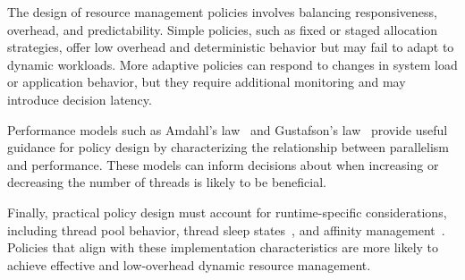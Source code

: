 The design of resource management policies involves balancing responsiveness, overhead, and predictability. Simple policies, such as fixed or staged allocation strategies, offer low overhead and deterministic behavior but may fail to adapt to dynamic workloads. More adaptive policies can respond to changes in system load or application behavior, but they require additional monitoring and may introduce decision latency.

Performance models such as Amdahl's law~\parencite{Amdahl1967} and Gustafson's law~\parencite{Gustafson1988} provide useful guidance for policy design by characterizing the relationship between parallelism and performance. These models can inform decisions about when increasing or decreasing the number of threads is likely to be beneficial.

Finally, practical policy design must account for runtime-specific considerations, including thread pool behavior, thread sleep states~\parencite{noauthor_welcome_nodate}, and affinity management~\parencite{eichenberger2012affinity}. Policies that align with these implementation characteristics are more likely to achieve effective and low-overhead dynamic resource management.

